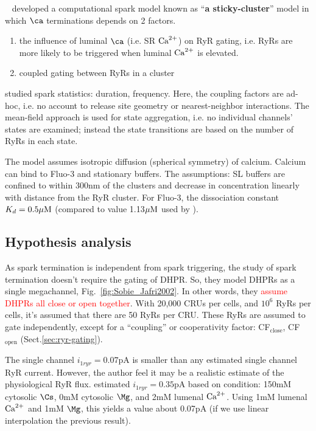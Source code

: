 ~\citep{sobie2002tcas} developed a computational spark model known as
``{\bf a sticky-cluster}'' model in which $\ca$ terminations
  depends on 2 factors.
\begin{enumerate}
  \item the influence of luminal $\ca$ (i.e. SR ${\text{Ca}^{2+}}$) on RyR gating,
    i.e. RyRs are more likely to be triggered when luminal ${\text{Ca}^{2+}}$ is elevated. 
    
  \item coupled gating between RyRs in a cluster
\end{enumerate}

\citep{sobie2002tcas} studied spark statistics: duration, frequency. Here, the
coupling factors are ad-hoc, i.e. no account to release site geometry or
nearest-neighbor interactions. The mean-field approach is used for state
aggregation, i.e. no individual channels' states are examined; instead the state
transitions are based on the number of RyRs in each state.

The model assumes isotropic diffusion (spherical symmetry) of calcium. Calcium
can bind to Fluo-3 and stationary buffers. The assumptions: SL buffers are
confined to within 300nm of the clusters and decrease in concentration linearly
with distance from the RyR cluster. For Fluo-3, the dissociation constant $K_d
= 0.5{\mu\text{M}}$ (compared to value 1.13${\mu\text{M}}$ used by \citep{smith1998}). 

\subsection{Hypothesis analysis}
\label{sec:hypothesis-analysis-8}

As spark termination is independent from spark triggering, the study of spark
termination doesn't require the gating of DHPR. So, they model DHPRs as a single
megachannel, Fig.~\ref{fig:Sobie_Jafri2002}.
In other words, they \textcolor{red}{assume DHPRs all close or open together}.
With 20,000 CRUs per cells, and $10^6$ RyRs per cells, it's assumed that there
are 50 RyRs per CRU. These RyRs are assumed to gate independently, except for a
``coupling'' or cooperativity factor: CF$_\text{close}$, CF$_\text{open}$
(Sect.\ref{sec:ryr-gating}).

The single channel $i_{1ryr}=0.07$pA is smaller than any estimated single
channel RyR current. However, the author feel it may be a realistic estimate of
the physiological RyR flux. \citep{mejia-alvarez1999} estimated
$i_{1ryr}=0.35$pA based on condition: 150mM cytosolic $\Cs$, 0mM cytosolic
$\Mg$, and 2mM lumenal ${\text{Ca}^{2+}}$. Using 1mM lumenal ${\text{Ca}^{2+}}$ and 1mM $\Mg$, this yields
a value about 0.07pA (if we use linear interpolation the previous result).

